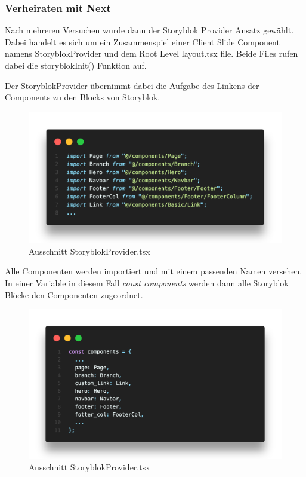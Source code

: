 \subsubsection*{Verheiraten mit Next}
Nach mehreren Versuchen wurde dann der Storyblok Provider Ansatz gewählt. Dabei handelt es sich um ein Zusammenspiel einer Client Slide Component namens StoryblokProvider und dem Root Level layout.tsx file. Beide Files rufen dabei die storyblokInit() Funktion auf. 

Der StoryblokProvider übernimmt dabei die Aufgabe des Linkens der Components zu den Blocks von Storyblok.

\begin{figure}[H]
    \centering
    \includegraphics[width=\linewidth]{pics/sb-provider-01.png}
    \caption{Ausschnitt StoryblokProvider.tsx}
\end{figure}

Alle Componenten werden importiert und mit einem passenden Namen versehen. In einer Variable in diesem Fall \emph{const components} werden dann alle Storyblok Blöcke den Componenten zugeordnet.

\begin{figure}[H]
    \centering
    \includegraphics[width=\linewidth]{pics/sb-provider-02.png}
    \caption{Ausschnitt StoryblokProvider.tsx}
\end{figure}

